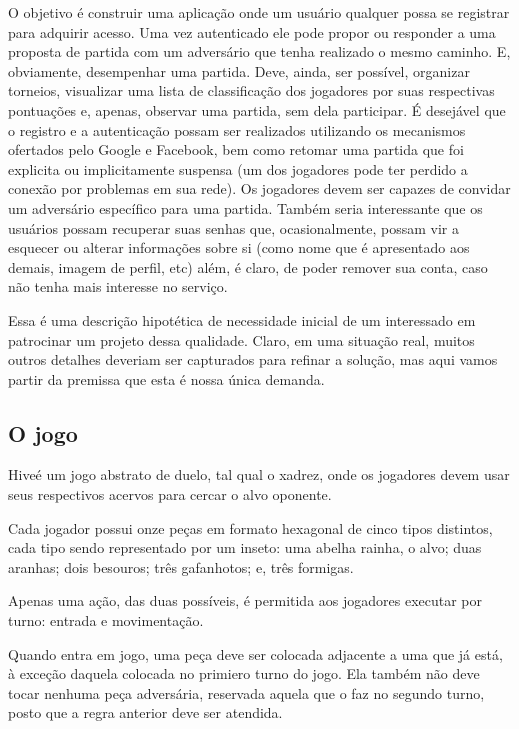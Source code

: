   O objetivo é construir uma aplicação onde um usuário qualquer possa se registrar para adquirir acesso. Uma vez autenticado ele pode propor ou responder a uma proposta de partida com um adversário que tenha realizado o mesmo caminho. E, obviamente, desempenhar uma partida. Deve, ainda, ser possível, organizar torneios, visualizar uma lista de classificação dos jogadores por suas respectivas pontuações e, apenas, observar uma partida, sem dela participar. É desejável que o registro e a autenticação possam ser realizados utilizando os mecanismos ofertados pelo Google e Facebook, bem como retomar uma partida que foi explicita ou implicitamente suspensa (um dos jogadores pode ter perdido a conexão por problemas em sua rede). Os jogadores devem ser capazes de convidar um adversário específico para uma partida. Também seria interessante que os usuários possam recuperar suas senhas que, ocasionalmente, possam vir a esquecer ou alterar informações sobre si (como nome que é apresentado aos demais, imagem de perfil, etc) além, é claro, de poder remover sua conta, caso não tenha mais interesse no serviço.

  Essa é uma descrição hipotética de necessidade inicial de um interessado em patrocinar um projeto dessa qualidade. Claro, em uma situação real, muitos outros detalhes deveriam ser capturados para refinar a solução, mas aqui vamos partir da premissa que esta é nossa única demanda.

  \subsection{O jogo}

    Hive\footnotemark é um jogo abstrato de duelo, tal qual o xadrez, onde os jogadores devem usar seus respectivos acervos para cercar o alvo oponente.

    Cada jogador possui onze peças em formato hexagonal de cinco tipos distintos, cada tipo sendo representado por um inseto: uma abelha rainha, o alvo; duas aranhas; dois besouros; três gafanhotos; e, três formigas.

    Apenas uma ação, das duas possíveis, é permitida aos jogadores executar por turno: entrada e movimentação.

    Quando entra em jogo, uma peça deve ser colocada adjacente a uma que já está, à exceção daquela colocada no primiero turno do jogo. Ela também não deve tocar nenhuma peça adversária, reservada aquela que o faz no segundo turno, posto que a regra anterior deve ser atendida.

